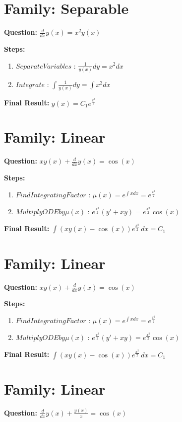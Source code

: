 \documentclass{article}
\begin{document}
\section*{Family: Separable}
\textbf{Question:} $\frac{d}{d x} y{\left(x \right)} = x^{2} y{\left(x \right)}$

\textbf{Steps:}
\begin{enumerate}
\item $Separate Variables$ :  $\frac{1}{y{\left(x \right)}} dy = x^{2} dx$
\item $Integrate$ :  $\int \frac{1}{y{\left(x \right)}} dy = \int x^{2} dx$
\end{enumerate}
\textbf{Final Result:} $y{\left(x \right)} = C_{1} e^{\frac{x^{3}}{3}}$

\section*{Family: Linear}
\textbf{Question:} $x y{\left(x \right)} + \frac{d}{d x} y{\left(x \right)} = \cos{\left(x \right)}$

\textbf{Steps:}
\begin{enumerate}
\item $Find Integrating Factor$ :  $\mu(x) = e^{\int x dx} = e^{\frac{x^{2}}{2}}$
\item $Multiply ODE by \mu(x)$ :  $e^{\frac{x^{2}}{2}}(y' + xy) = e^{\frac{x^{2}}{2}} \cos{\left(x \right)}$
\end{enumerate}
\textbf{Final Result:} $\int \left(x y{\left(x \right)} - \cos{\left(x \right)}\right) e^{\frac{x^{2}}{2}}\, dx = C_{1}$

\section*{Family: Linear}
\textbf{Question:} $x y{\left(x \right)} + \frac{d}{d x} y{\left(x \right)} = \cos{\left(x \right)}$

\textbf{Steps:}
\begin{enumerate}
\item $Find Integrating Factor$ :  $\mu(x) = e^{\int x dx} = e^{\frac{x^{2}}{2}}$
\item $Multiply ODE by \mu(x)$ :  $e^{\frac{x^{2}}{2}}(y' + xy) = e^{\frac{x^{2}}{2}} \cos{\left(x \right)}$
\end{enumerate}
\textbf{Final Result:} $\int \left(x y{\left(x \right)} - \cos{\left(x \right)}\right) e^{\frac{x^{2}}{2}}\, dx = C_{1}$

\section*{Family: Linear}
\textbf{Question:} $\frac{d}{d x} y{\left(x \right)} + \frac{y{\left(x \right)}}{x} = \cos{\left(x \right)}$
\end{document}
